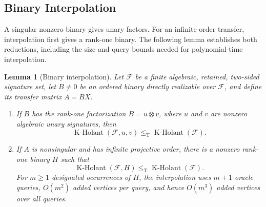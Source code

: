 \documentclass[11pt,letterpaper,onecolumn]{article}
\theoremstyle{plain}
\newtheorem{lemma}[lemma]{Lemma}
\theoremstyle{definition}
\theoremstyle{remark}
\newcommand{\cF}{\mathcal F}
\newcommand{\KHolant}{\operatorname{K\text{-}Holant}}
\newcommand{\leT}{\leq_{\mathrm T}}
\begin{document}
\subsection{Binary Interpolation}
\label{proofsubsec:central-descent}

A singular nonzero binary gives unary factors. For an infinite-order
transfer, interpolation first gives a rank-one binary. The following lemma
establishes both reductions, including the size and query bounds needed
for polynomial-time interpolation.

\begin{lemma}[Binary interpolation]
\label{lem:binary-interpolation}
Let \(\cF\) be a finite algebraic, retained, two-sided signature set,
let \(B\ne0\) be an ordered binary directly realizable over \(\cF\),
and define its transfer matrix \(A=BX\).
\begin{enumerate}
\item If \(B\) has the rank-one factorization \(B=u\otimes v\), where
      \(u\) and \(v\) are nonzero algebraic unary signatures, then
      \[
        \KHolant(\cF,u,v)\leT\KHolant(\cF).
      \]
\item If \(A\) is nonsingular and has infinite projective order, there is
      a nonzero rank-one binary \(H\) such that
      \[
        \KHolant(\cF,H)\leT\KHolant(\cF).
      \]
      For \(m\ge1\) designated occurrences of \(H\), the interpolation uses
      \(m+1\) oracle queries, \(O(m^2)\) added vertices per query, and hence
      \(O(m^3)\) added vertices over all queries.
\end{enumerate}
\end{lemma}
\end{document}
